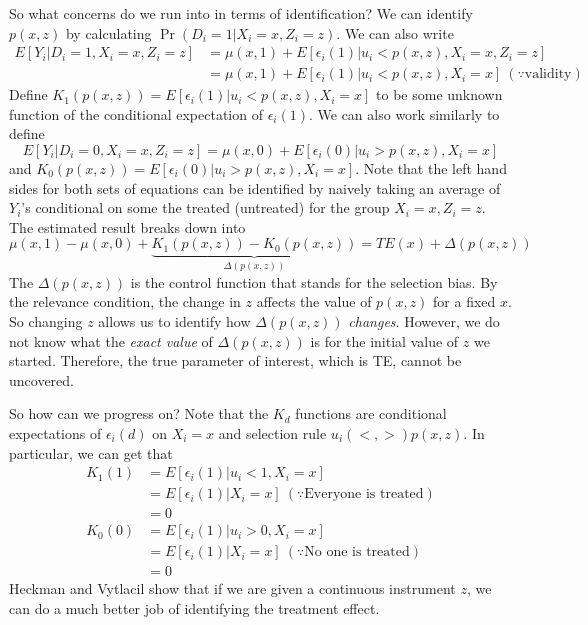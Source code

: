 \documentclass[12pt]{article}
\theoremstyle{definition}
\theoremstyle{property}
\theoremstyle{assumption}
\theoremstyle{example}
\theoremstyle{comment}
\begin{document}
\par
So what concerns do we run into in terms of identification? We can identify $p(x,z)$ by calculating $\Pr(D_i=1|X_i=x, Z_i=z)$. We can also write
\begin{align*}
E[Y_i|D_i=1, X_i=x, Z_i=z]&=\mu(x,1)+E[\epsilon_i(1)|u_i<p(x,z), X_i=x, Z_i=z]\\
&=\mu(x,1)+E[\epsilon_i(1)|u_i<p(x,z), X_i=x] \ (\because\text{validity})
\end{align*}
Define $K_1(p(x,z))=E[\epsilon_i(1)|u_i<p(x,z), X_i=x]$ to be some unknown function of the conditional expectation of $\epsilon_i(1)$. We can also work similarly to define 
\[
E[Y_i|D_i=0, X_i=x, Z_i=z]=\mu(x,0)+E[\epsilon_i(0)|u_i>p(x,z), X_i=x]
\] 
and $K_0(p(x,z))=E[\epsilon_i(0)|u_i>p(x,z), X_i=x]$. Note that the left hand sides for both sets of equations can be identified by naively taking an average of $Y_i$'s conditional on some the treated (untreated) for the group $X_i=x, Z_i=z$. The estimated result breaks down into
\[
\mu(x,1)-\mu(x,0)+\underbrace{K_1(p(x,z))-K_0(p(x,z)) }_{\Delta(p(x,z))}= TE(x)+\Delta(p(x,z))
\]
The $\Delta(p(x,z))$ is the control function that stands for the selection bias. By the relevance condition, the change in $z$ affects the value of $p(x,z)$ for a fixed $x$. So changing $z$ allows us to identify how $\Delta(p(x,z))$ \textit{changes}. However, we do not know what the \textit{exact value} of $\Delta(p(x,z))$ is for the initial value of $z$ we started. Therefore, the true parameter of interest, which is TE, cannot be uncovered. \par
So how can we progress on? Note that the $K_d$ functions are conditional expectations of $\epsilon_i(d)$ on $X_i=x$ and selection rule $u_i (<,>) p(x,z)$. In particular, we can get that
\begin{align*}
K_1(1) &=E[\epsilon_i(1)|u_i<1,X_i=x] \\
&=E[\epsilon_i(1)|X_i=x] \ (\because\text{Everyone is treated})\\
&=0\\
K_0(0) &=E[\epsilon_i(1)|u_i>0,X_i=x] \\
&=E[\epsilon_i(1)|X_i=x] \ (\because\text{No one is treated})\\
&=0
\end{align*}
Heckman and Vytlacil show that if we are given a continuous instrument $z$, we can do a much better job of identifying the treatment effect. 
\end{document}
